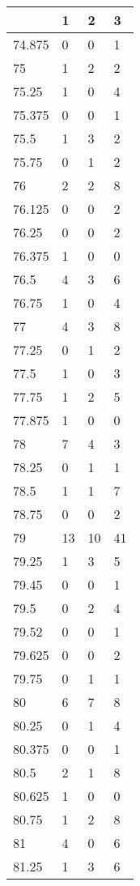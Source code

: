 \begin{table}[]
\begin{tabular}{llll}
	\end{tabular}
	\begin{tabular}{llll}
		& 1  & 2  & 3  \\
		\hline
		74.875 & 0  & 0  & 1  \\
		75     & 1  & 2  & 2  \\
		75.25  & 1  & 0  & 4  \\
		75.375 & 0  & 0  & 1  \\
		75.5   & 1  & 3  & 2  \\
		75.75  & 0  & 1  & 2  \\
		76     & 2  & 2  & 8  \\
		76.125 & 0  & 0  & 2  \\
		76.25  & 0  & 0  & 2  \\
		76.375 & 1  & 0  & 0  \\
		76.5   & 4  & 3  & 6  \\
		76.75  & 1  & 0  & 4  \\
		77     & 4  & 3  & 8  \\
		77.25  & 0  & 1  & 2  \\
		77.5   & 1  & 0  & 3  \\
		77.75  & 1  & 2  & 5  \\
		77.875 & 1  & 0  & 0  \\
		78     & 7  & 4  & 3  \\
		78.25  & 0  & 1  & 1  \\
		78.5   & 1  & 1  & 7  \\
		78.75  & 0  & 0  & 2  \\
		79     & 13 & 10 & 41 \\
		79.25  & 1  & 3  & 5  \\
		79.45  & 0  & 0  & 1  \\
		79.5   & 0  & 2  & 4  \\
		79.52  & 0  & 0  & 1  \\
		79.625 & 0  & 0  & 2  \\
		79.75  & 0  & 1  & 1  \\
		80     & 6  & 7  & 8  \\
		80.25  & 0  & 1  & 4  \\
		80.375 & 0  & 0  & 1  \\
		80.5   & 2  & 1  & 8  \\
		80.625 & 1  & 0  & 0  \\
		80.75  & 1  & 2  & 8  \\
		81     & 4  & 0  & 6  \\
		81.25  & 1  & 3  & 6  \\
	\end{tabular}

\end{table}

